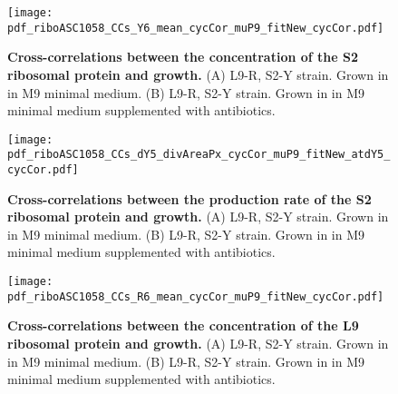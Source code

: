 
\begin{figure}
    \centering
    \texttt{[image: pdf\_riboASC1058\_CCs\_Y6\_mean\_cycCor\_muP9\_fitNew\_cycCor.pdf]}
    \caption{ 
        \textbf{Cross-correlations between the concentration of the S2 ribosomal protein and growth.}
        (A) L9-R, S2-Y strain. Grown in in M9 minimal medium.
        (B) L9-R, S2-Y strain. Grown in in M9 minimal medium supplemented with antibiotics. 
    }
    \label{fig:ribo:CCsEmuY}
\end{figure}

\begin{figure}
    \centering
    \texttt{[image: pdf\_riboASC1058\_CCs\_dY5\_divAreaPx\_cycCor\_muP9\_fitNew\_atdY5\_cycCor.pdf]}
    \caption{ 
        \textbf{Cross-correlations between the production rate of the S2 ribosomal protein and growth.}
        (A) L9-R, S2-Y strain. Grown in in M9 minimal medium.
        (B) L9-R, S2-Y strain. Grown in in M9 minimal medium supplemented with antibiotics. 
%
    }
    \label{fig:ribo:CCsPmuY}
\end{figure}





\begin{figure}
    \centering
    \texttt{[image: pdf\_riboASC1058\_CCs\_R6\_mean\_cycCor\_muP9\_fitNew\_cycCor.pdf]}
    \caption{ 
        \textbf{Cross-correlations between the concentration of the L9 ribosomal protein and growth.}
        (A) L9-R, S2-Y strain. Grown in in M9 minimal medium.
        (B) L9-R, S2-Y strain. Grown in in M9 minimal medium supplemented with antibiotics. 
%
    }
    \label{fig:ribo:CCsEmuY}
\end{figure}

